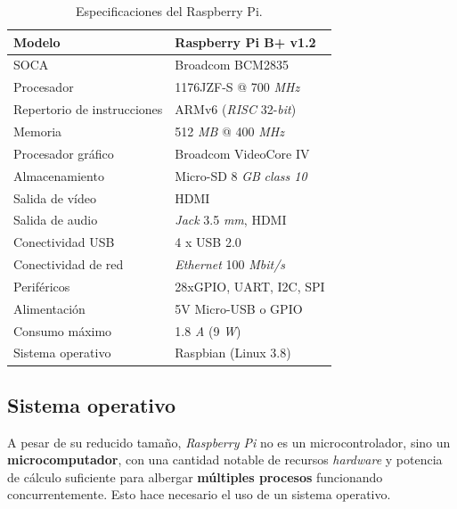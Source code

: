 \begin{table}[H]
	\begin{center}
		\begin{tabular}{|l|l|}
			\hline Modelo & Raspberry Pi B+ v1.2 \\
			\hline \acrshort{SOCA} & Broadcom BCM2835 \\
			\hline Procesador &  1176JZF-S @ 700 \textit{MHz} \\
			\hline Repertorio de instrucciones & ARMv6 (\textit{RISC} 32-\textit{bit}) \\
			\hline Memoria & 512 \textit{MB} @ 400 \textit{MHz} \\
			\hline Procesador gráfico & Broadcom VideoCore IV \\ 		
			\hline Almacenamiento & Micro-\acrshort{SD} 8 \textit{GB} \textit{class 10} \\
			\hline Salida de vídeo & \acrshort{HDMI} \\
			\hline Salida de audio & \textit{Jack} 3.5 \textit{mm}, \acrshort{HDMI} \\
			\hline Conectividad USB & 4 x \acrshort{USB} 2.0 \\
			\hline Conectividad de red & \textit{Ethernet} 100 \textit{Mbit/s} \\
			\hline Periféricos & 28xGPIO, \acrshort{UART}, \acrshort{I2C}, \acrshort{SPI} \\ 
			\hline Alimentación & 5V Micro-\acrshort{USB} o \acrshort{GPIO} \\
			\hline Consumo máximo & 1.8 \textit{A} (9 \textit{W}) \\ 
			\hline Sistema operativo & Raspbian (Linux 3.8) \\
			\hline 
		\end{tabular}
		\smallskip
		\caption[Especificaciones del Raspberry Pi.]{\label{tab:raspberry} Especificaciones del Raspberry Pi. \cite{raspberry}}
	\end{center}
\end{table}

\smallskip

\subsection{Sistema operativo}

A pesar de su reducido tamaño, \textit{Raspberry Pi} no es un microcontrolador, sino un \textbf{microcomputador}, con una cantidad notable de recursos \textit{hardware} y potencia de cálculo suficiente para albergar \textbf{múltiples procesos} funcionando concurrentemente. Esto hace necesario el uso de un sistema operativo.

